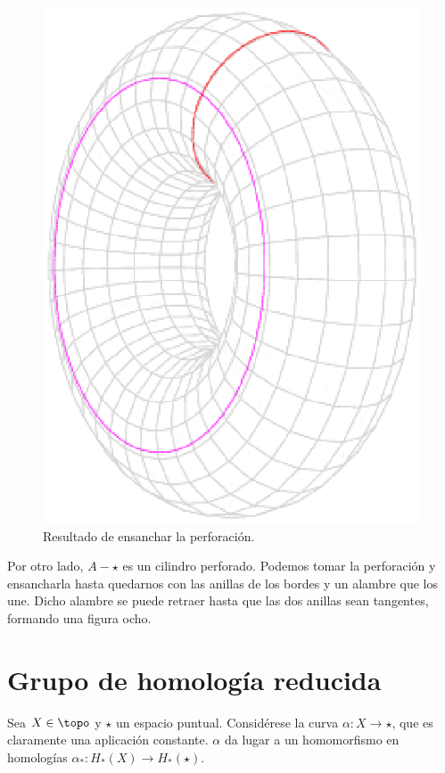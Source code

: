 \begin{ejem}
\begin{figure}[h]
\includegraphics[scale=0.5]{Figures/FiguraOcho.eps}
\caption{Resultado de ensanchar la perforación.}
\end{figure}

Por otro lado, $A-\star$ es un cilindro perforado. Podemos tomar la perforación y ensancharla hasta quedarnos con las anillas de los bordes y un alambre que los une. Dicho alambre se puede retraer hasta que las dos anillas sean tangentes, formando una figura ocho.
\end{ejem}

\section{Grupo de homología reducida}
Sea $X \in \topo$ y $\star$ un espacio puntual. Considérese la curva $\alpha: X \longrightarrow \star$, que es claramente una aplicación constante. $\alpha$ da lugar a un homomorfismo en homologías $\alpha_*: H_*(X) \longrightarrow H_*(\star)$. 

